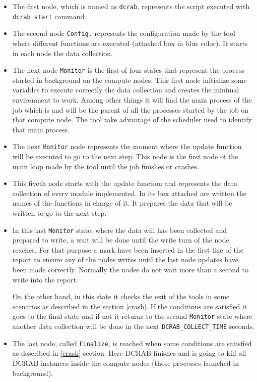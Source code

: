 \documentclass[10pt,a4paper]{report}
\begin{document}
\begin{itemize}
  \item The first node, which is named as \verb+dcrab+, represents the script executed with \verb+dcrab start+ command.
  \item The second node \verb+Config.+ represents the configuration made by the tool where different functions are executed (attached box in blue color). It starts in each node the data collection.
  \item The next node \verb+Monitor+ is the first of four states that represent the process started in background on the compute nodes. This first node initialize some variables to execute correctly the data collection and creates the minimal environment to work. Among other things it will find the main process of the job which is and will be the parent of all the processes started by the job on that compute node. The tool take advantage of the scheduler used to identify that main process.
  \item The next \verb+Monitor+ node represents the moment where the update function will be executed to go to the next step. This node is the first node of the main loop made by the tool until the job finishes or crashes.
  \item This fiveth node starts with the update function and represents the data collection of every module implemented. In its box attached are written the names of the functions in charge of it. It prepares the data that will be written to go to the next step.
  \item In this last \verb+Monitor+ state, where the data will has been collected and prepared to write, a wait will be done until the write turn of the node reaches. For that purpose a mark have been inserted in the first line of the report to ensure any of the nodes writes until the last node updates have been made correctly. Normally the nodes do not wait more than a second to write into the report.

  On the other hand, in this state it checks the exit of the tools in some scenarios as described in the section \ref{crash}. If the conditions are satisfied it goes to the final state and if not it returns to the second \verb+Monitor+ state where another data collection will be done in the next \verb+DCRAB_COLLECT_TIME+ seconds.
  \item The last node, called \verb+Finalize+, is reached when some conditions are satisfied as described in \ref{crash} section. Here DCRAB finishes and is going to kill all DCRAB instances inside the compute nodes (those processes launched in background).
\end{itemize}
\end{document}
